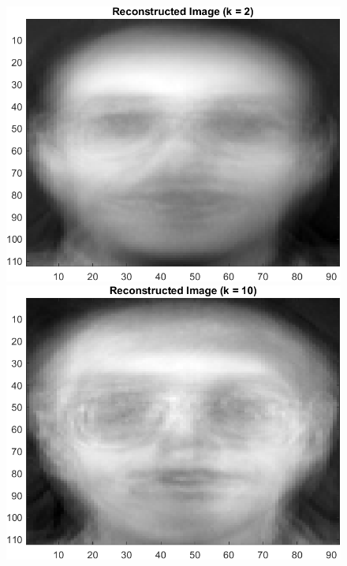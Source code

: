 \documentclass{article}
\begin{document}
\begin{figure}[!htb]
    \centering
    \begin{minipage}[b]{0.3\textwidth}
        \includegraphics[width=\textwidth]{orl_recon_2.png}
    \end{minipage}
    \begin{minipage}[b]{0.3\textwidth}
        \includegraphics[width=\textwidth]{orl_recon_10.png}
    \end{minipage}

\end{figure}
\end{document}
